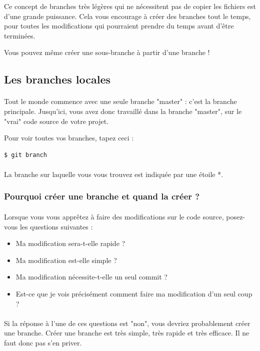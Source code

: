 \documentclass[french, a4paper, 12pt, titlepage]{article}
\begin{document}
Ce concept de branches très légères qui ne nécessitent pas de copier les fichiers est d’une grande puissance. Cela vous encourage à créer des branches tout le temps, pour toutes les modifications qui pourraient prendre du temps avant d’être terminées.

Vous pouvez même créer une sous-branche à partir d’une branche !


\subsection{Les branches locales}
\paragraph{}Tout le monde commence avec une seule branche "master" : c’est la branche principale. Jusqu’ici, vous avez donc travaillé dans la branche "master", sur le "vrai" code source de votre projet.

Pour voir toutes vos branches, tapez ceci :
\begin{lstlisting}
$ git branch
\end{lstlisting}

\paragraph{}La branche sur laquelle vous vous trouvez est indiquée par une étoile *.

\subsubsection{Pourquoi créer une branche et quand la créer ?}
\paragraph{}Lorsque vous vous apprêtez à faire des modifications sur le code source, posez-vous les questions suivantes :
\begin{itemize}
\item Ma modification sera-t-elle rapide ?
\item Ma modification est-elle simple ?
\item Ma modification nécessite-t-elle un seul commit ?
\item Est-ce que je vois précisément comment faire ma modification d’un seul coup ?
\end{itemize}

\paragraph{}Si la réponse à l’une de ces questions est "non", vous devriez probablement créer une branche. Créer une branche est très simple, très rapide et très efficace. Il ne faut donc pas s’en priver.
\end{document}

